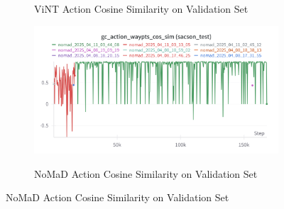 \documentclass[12pt]{article}
\begin{document}
\begin{appendices}
\begin{figure}[H]
\begin{subfigure}[b]{0.48\textwidth}
        \label{fig:action_test_vint}
        \caption{ViNT Action Cosine Similarity on Validation Set}
    \end{subfigure}
    \hfill
    \begin{subfigure}[b]{0.48\textwidth}
        \centering
        \includegraphics[width=\textwidth]{images/gc_action_cos_sim_test.png}
        \label{fig:action_test_nomad}
        \caption{NoMaD Action Cosine Similarity on Validation Set}
    \end{subfigure}
\end{figure}

\end{appendices}
\end{document}
